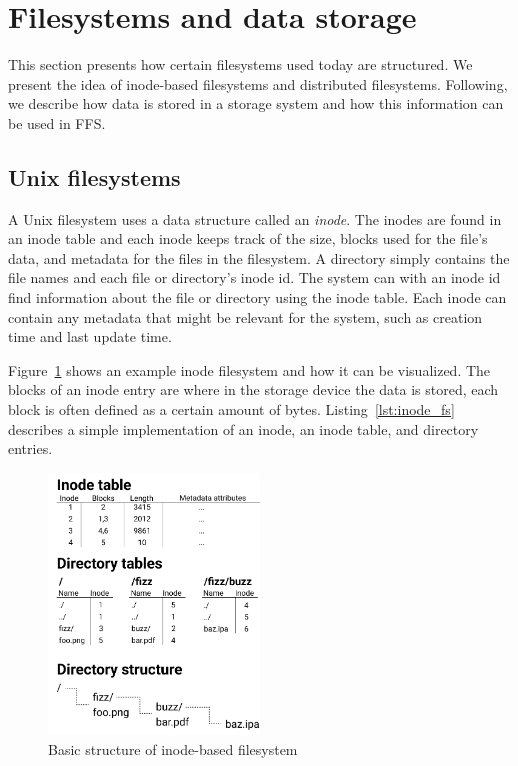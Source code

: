 \section{Filesystems and data storage}
This section presents how certain filesystems used today are structured. We present the idea of inode-based filesystems and distributed filesystems. Following, we describe how data is stored in a storage system and how this information can be used in FFS.

\subsection{Unix filesystems}
A Unix filesystem uses a data structure called an \textit{inode}. The inodes are found in an inode table and each inode keeps track of the size, blocks used for the file's data, and metadata for the files in the filesystem. A directory simply contains the file names and each file or directory's inode id. The system can with an inode id find information about the file or directory using the inode table. Each inode can contain any metadata that might be relevant for the system, such as creation time and last update time. 

Figure~\ref{fig:inode_diag} shows an example inode filesystem and how it can be visualized. The blocks of an inode entry are where in the storage device the data is stored, each block is often defined as a certain amount of bytes. Listing~\ref{lst:inode_fs} describes a simple implementation of an inode, an inode table, and directory entries. 


\begin{figure}[!ht]
	\begin{center}
	  \includegraphics[width=0.5\textwidth]{figures/inode_diagram.png}
	\end{center}
	\caption{Basic structure of inode-based filesystem}
	\label{fig:inode_diag}
\end{figure}

